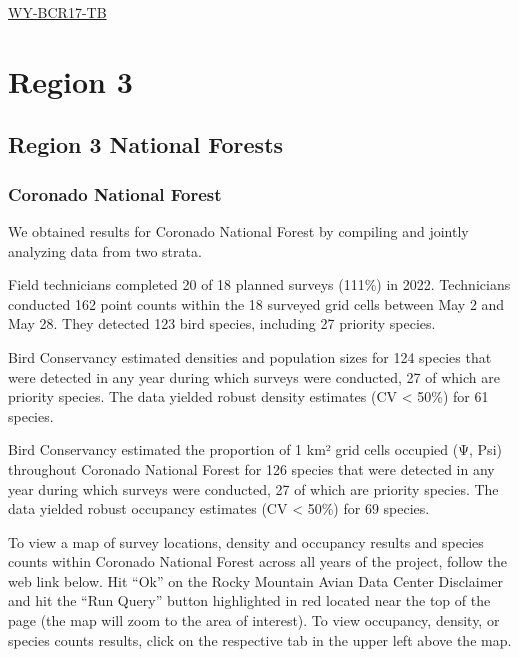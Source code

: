 \documentclass[
  letterpaper,
  DIV=11,
  numbers=noendperiod,
  oneside]{scrreprt}
\begin{document}
\href{http://www.rmbo.org/new_site/adc/QueryWindow.aspx\#N4IgzgLgTghhCuBbEAuABCA6gTQLQCEBhAJQEYB2XAFX3SoAt4A7AEwFMo18YwBLJtADk4vAPZMYAGzQBxWGDCSYrEAF8gA=}{WY-BCR17-TB}

\hypertarget{region-3}{%
\section{Region 3}\label{region-3}}

\hypertarget{region-3-national-forests}{%
\subsection{Region 3 National Forests}\label{region-3-national-forests}}

\hypertarget{coronado-national-forest}{%
\subsubsection{Coronado National
Forest}\label{coronado-national-forest}}

We obtained results for Coronado National Forest by compiling and
jointly analyzing data from two strata.

Field technicians completed 20 of 18 planned surveys (111\%) in 2022.
Technicians conducted 162 point counts within the 18 surveyed grid cells
between May 2 and May 28. They detected 123 bird species, including 27
priority species.

Bird Conservancy estimated densities and population sizes for 124
species that were detected in any year during which surveys were
conducted, 27 of which are priority species. The data yielded robust
density estimates (CV \textless{} 50\%) for 61 species.

Bird Conservancy estimated the proportion of 1 km² grid cells occupied
(Ψ, Psi) throughout Coronado National Forest for 126 species that were
detected in any year during which surveys were conducted, 27 of which
are priority species. The data yielded robust occupancy estimates (CV
\textless{} 50\%) for 69 species.

To view a map of survey locations, density and occupancy results and
species counts within Coronado National Forest across all years of the
project, follow the web link below. Hit ``Ok'' on the Rocky Mountain
Avian Data Center Disclaimer and hit the ``Run Query'' button
highlighted in red located near the top of the page (the map will zoom
to the area of interest). To view occupancy, density, or species counts
results, click on the respective tab in the upper left above the map.
\end{document}
